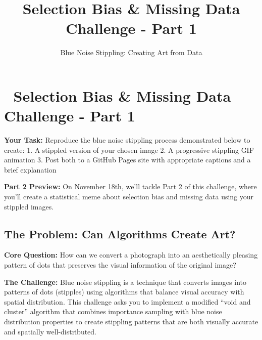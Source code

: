 \documentclass[
  letterpaper,
  DIV=11,
  numbers=noendperiod]{scrartcl}
\title{Selection Bias \& Missing Data Challenge - Part 1}
\subtitle{Blue Noise Stippling: Creating Art from Data}
\author{}
\date{}
\begin{document}
\maketitle


\section{🎨 Selection Bias \& Missing Data Challenge - Part
1}\label{selection-bias-missing-data-challenge---part-1}

\begin{tcolorbox}[enhanced jigsaw, arc=.35mm, colback=white, opacitybacktitle=0.6, rightrule=.15mm, leftrule=.75mm, title=\textcolor{quarto-callout-important-color}{\faExclamation}\hspace{0.5em}{📊 Challenge Requirements}, toptitle=1mm, toprule=.15mm, left=2mm, titlerule=0mm, coltitle=black, bottomtitle=1mm, opacityback=0, colframe=quarto-callout-important-color-frame, breakable, bottomrule=.15mm, colbacktitle=quarto-callout-important-color!10!white]

\textbf{Your Task:} Reproduce the blue noise stippling process
demonstrated below to create: 1. A stippled version of your chosen image
2. A progressive stippling GIF animation 3. Post both to a GitHub Pages
site with appropriate captions and a brief explanation

\textbf{Part 2 Preview:} On November 18th, we'll tackle Part 2 of this
challenge, where you'll create a statistical meme about selection bias
and missing data using your stippled images.

\end{tcolorbox}

\subsection{The Problem: Can Algorithms Create
Art?}\label{the-problem-can-algorithms-create-art}

\textbf{Core Question:} How can we convert a photograph into an
aesthetically pleasing pattern of dots that preserves the visual
information of the original image?

\textbf{The Challenge:} Blue noise stippling is a technique that
converts images into patterns of dots (stipples) using algorithms that
balance visual accuracy with spatial distribution. This challenge asks
you to implement a modified ``void and cluster'' algorithm that combines
importance sampling with blue noise distribution properties to create
stippling patterns that are both visually accurate and spatially
well-distributed.
\end{document}
